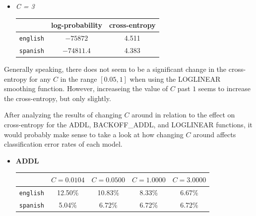 \documentclass[11pt]{article}
\begin{document}
\begin{enumerate}
\begin{enumerate}[label=(\alph*)]
\begin{itemize}
\begin{itemize}
			\item[] \hspace{-24pt} \textit{C = 3} 	 \vspace{4pt} \\
				\begin{center}\begin{tabular}{| r || c | c |}
				\hline
									& log-probability	& cross-entropy \\
				\hline \hline
				\texttt{english}	& $-75872$			& 4.511			\\
				\texttt{spanish}	& $-74811.4$		& 4.383			\\
				\hline
				
				\end{tabular}\end{center} \vspace{8pt}

			\end{itemize} \vspace{8pt}

			Generally speaking, there does not seem to be a significant change in the cross-entropy for any $C$ in the range $[0.05, 1]$ when using the LOGLINEAR smoothing function. However, increaseing the value of $C$ past $1$ seems to increase the cross-entropy, but only slightly.
			\vspace{8pt} \\

		\end{itemize}

		After analyzing the results of changing $C$ around in relation to the effect on cross-entropy for the ADDL, BACKOFF\_ADDL, and LOGLINEAR functions, it would probably make sense to take a look at how changing $C$ around affects classification error rates of each model.

		\begin{itemize}
		\item[] \hspace{-24pt} \textbf{ADDL} \vspace{8pt}

			\begin{center}\begin{tabular}{| r || c | c | c | c |}
			\hline
							 & $C=0.0104$ & $C=0.0500$ & $C=1.0000$ & $C=3.0000$ \\
			\hline \hline
			\texttt{english} & 12.50\%    & 10.83\%	   & 8.33\%     & 6.67\%	 \\
			\texttt{spanish} & 5.04\%     & 6.72\%	   & 6.72\%     & 6.72\%	 \\
			\hline
			\end{tabular}\end{center} \vspace{8pt}


\end{itemize}
\end{enumerate}
\end{enumerate}
\end{document}
